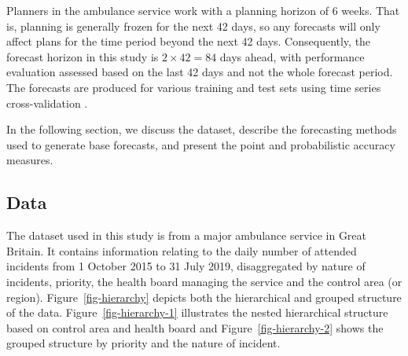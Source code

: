 \documentclass[
  authoryear,
  preprint,
  3p]{elsarticle}
\begin{document}
Planners in the ambulance service work with a planning horizon of 6
weeks. That is, planning is generally frozen for the next 42 days, so
any forecasts will only affect plans for the time period beyond the next
42 days. Consequently, the forecast horizon in this study is
\(2 \times 42 = 84\) days ahead, with performance evaluation assessed
based on the last 42 days and not the whole forecast period. The
forecasts are produced for various training and test sets using time
series cross-validation \citep{hyndman2021forecasting}.

In the following section, we discuss the dataset, describe the
forecasting methods used to generate base forecasts, and present the
point and probabilistic accuracy measures.

\subsection{Data}\label{sec-data}

The dataset used in this study is from a major ambulance service in
Great Britain. It contains information relating to the daily number of
attended incidents from 1 October 2015 to 31 July 2019, disaggregated by
nature of incidents, priority, the health board managing the service and
the control area (or region). Figure~\ref{fig-hierarchy} depicts both
the hierarchical and grouped structure of the data.
Figure~\ref{fig-hierarchy-1} illustrates the nested hierarchical
structure based on control area and health board and
Figure~\ref{fig-hierarchy-2} shows the grouped structure by priority and
the nature of incident.
\end{document}
